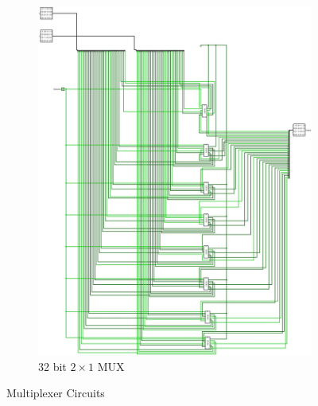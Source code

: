 \documentclass[12pt]{article}
\begin{document}
\begin{figure}[H]
    \begin{subfigure}[b]{0.4\textwidth}
        \includegraphics[width=\textwidth]{images/MUX_32_bit.jpg}
        \caption{32 bit $2\times1$ MUX}
        \label{fig:32b2x1}
    \end{subfigure}

    \caption{Multiplexer Circuits}\label{fig:mux}
\end{figure}

\newpage
\end{document}
